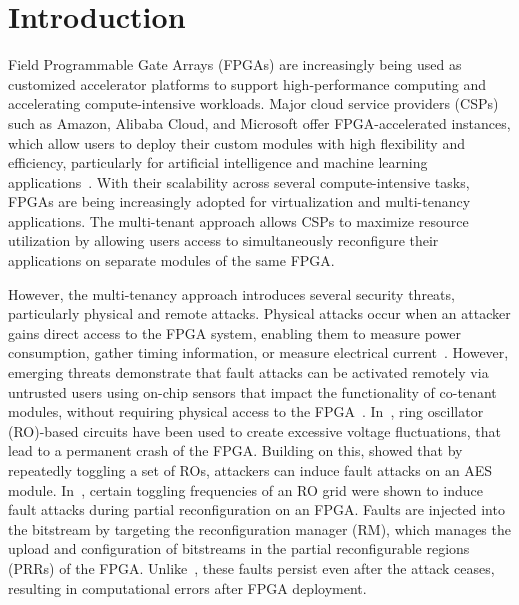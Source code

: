 \section{Introduction}

Field Programmable Gate Arrays (FPGAs) are increasingly being used as customized accelerator platforms to support high-performance computing and accelerating compute-intensive workloads. Major cloud service providers (CSPs) such as Amazon, Alibaba Cloud, and Microsoft offer FPGA-accelerated instances, which allow users to deploy their custom modules with high flexibility and efficiency, particularly for artificial intelligence and machine learning applications~\cite{ref_17_amazon, firestone2018azure}. With their scalability across several compute-intensive tasks, FPGAs are being increasingly adopted for virtualization and multi-tenancy applications. The multi-tenant approach allows CSPs to maximize resource utilization by allowing users access to simultaneously reconfigure their applications on separate modules of the same FPGA.  

However, the multi-tenancy approach introduces several security threats, particularly physical and remote attacks. Physical attacks occur when an attacker gains direct access to the FPGA system, enabling them to measure power consumption, gather timing information, or measure electrical current~\cite{moradi2011vulnerability, standaert2004power, standaert2006updates}. However, emerging threats demonstrate that fault attacks can be activated remotely via untrusted users using on-chip sensors that impact the functionality of co-tenant modules, without requiring physical access to the FPGA~\cite{trimberger2017security}. In~\cite{8056840}, ring oscillator (RO)-based circuits have been used to create excessive voltage fluctuations, that lead to a permanent crash of the FPGA. Building on this, \cite{FPGAhammer, 7809042, 8844478} showed that by repeatedly toggling a set of ROs, attackers can induce fault attacks on an AES module. In~\cite{chaudhuri2024hackingfabrictargetingpartial}, certain toggling frequencies of an RO grid were shown to induce fault attacks during partial reconfiguration on an FPGA. Faults are injected into the bitstream by targeting the reconfiguration manager (RM), which manages the upload and configuration of bitstreams in the partial reconfigurable regions (PRRs) of the FPGA. Unlike~\cite{8056840, FPGAhammer, 7809042, 8844478}, these faults persist even after the attack ceases, resulting in computational errors after FPGA deployment.

